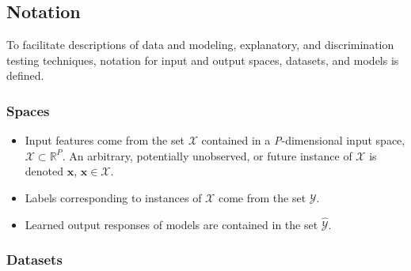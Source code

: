 \documentclass[information,article,submit,moreauthors,pdftex]{definitions/mdpi}
\begin{document}
\subsection{Notation}\label{ssec:not}

To facilitate descriptions of data and modeling, explanatory, and discrimination testing techniques, notation for input and output spaces, datasets, and models is defined.

\subsubsection{Spaces} 
 
	\begin{itemize}[leftmargin=*,labelsep=5.8mm]
		\item Input features come from the set $\mathcal{X}$ contained in a \textit{P}-dimensional input space, $\mathcal{X} \subset \mathbb{R}^P$.  An arbitrary, potentially unobserved, or future instance of $\mathcal{X}$ is denoted $\mathbf{x}$, $\mathbf{x} \in \mathcal{X}$.
		\item Labels corresponding to instances of $\mathcal{X}$ come from the set $\mathcal{Y}$.
		\item Learned output responses of models are contained in the set $\mathcal{\hat{Y}}$. %
	\end{itemize}	
	
\subsubsection{Datasets} 
\end{document}
